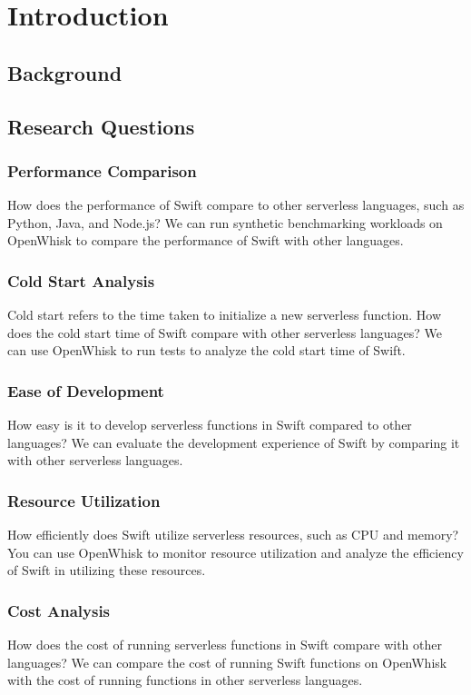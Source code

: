 \chapter{Introduction}
\etocsettocstyle{\rule{\textwidth}{1pt}}{\rule{\textwidth}{1pt}} %
\localtableofcontents
\section{Background}
\section{Research Questions}
\subsection{Performance Comparison}
How does the performance of Swift compare to other serverless languages, such as Python, Java, and Node.js? We can run synthetic benchmarking workloads on OpenWhisk to compare the performance of Swift with other languages.
\subsection{Cold Start Analysis}
Cold start refers to the time taken to initialize a new serverless function. How does the cold start time of Swift compare with other serverless languages? We can use OpenWhisk to run tests to analyze the cold start time of Swift.
\subsection{Ease of Development}
How easy is it to develop serverless functions in Swift compared to other languages? We can evaluate the development experience of Swift by comparing it with other serverless languages.
\subsection{Resource Utilization}
How efficiently does Swift utilize serverless resources, such as CPU and memory? You can use OpenWhisk to monitor resource utilization and analyze the efficiency of Swift in utilizing these resources.
\subsection{Cost Analysis}
How does the cost of running serverless functions in Swift compare with other languages? We can compare the cost of running Swift functions on OpenWhisk with the cost of running functions in other serverless languages.
